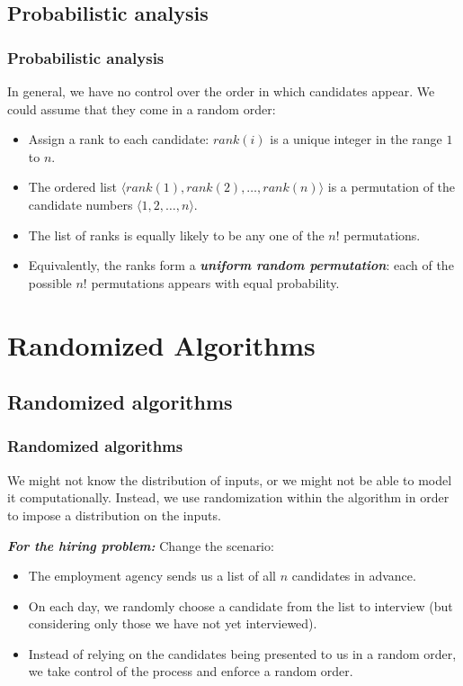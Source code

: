 \documentclass[notes,serif]{beamer}
\begin{document}
\subsection{Probabilistic analysis}
\begin{frame}
  \frametitle{Probabilistic analysis}
  In general, we have no control over the order in which candidates appear.
  We could assume that they come in a random order:
  \begin{itemize}
    \item Assign a rank to each candidate: $rank(i)$ is a unique integer in the range $1$ to $n$.
    \item The ordered list $\langle rank(1), rank(2), \dots , rank(n)\rangle$ is a permutation of the candidate numbers $\langle 1, 2, \dots , n \rangle$.
    \item The list of ranks is equally likely to be any one of the $n!$ permutations.
    \item Equivalently, the ranks form a {\bf \em uniform random permutation}: each of the possible
$n!$ permutations appears with equal probability.
  \end{itemize}
\end{frame}

\section{Randomized Algorithms}
\subsection{Randomized algorithms}
\begin{frame}
\frametitle{Randomized algorithms}
    We might not know the distribution of inputs, or we might not be able to model it computationally.  Instead, we use randomization within the algorithm in order to impose a distribution on the inputs.
  \begin{block}{{\bf \em For the hiring problem:} Change the scenario:}
  \begin{itemize}
    \item The employment agency sends us a list of all $n$ candidates in advance.
    \item On each day, we randomly choose a candidate from the list to interview (but considering only those we have not yet interviewed).
    \item Instead of relying on the candidates being presented to us in a random order, we take control of the process and enforce a random order.
  \end{itemize}
  \end{block}
\end{frame}
\end{document}
